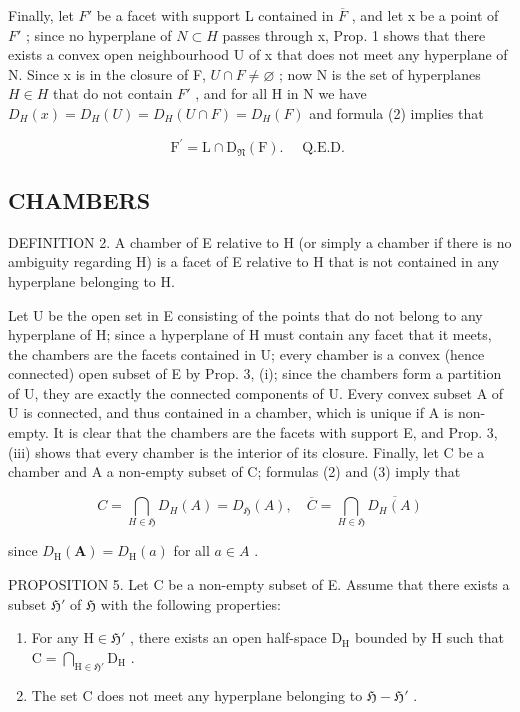 Finally, let \(F'\) be a facet with support L contained in \(\overline{F}\) , and let x be a point of \(F'\) ; since no hyperplane of \(N \subset H\) passes through x, Prop. 1 shows that there exists a convex open neighbourhood U of x that does not meet any hyperplane of N. Since x is in the closure of F, \(U \cap F \neq \varnothing\) ; now N is the set of hyperplanes \(H \in H\) that do not contain \(F'\) , and for all H in N we have \(D_{H}(x) = D_{H}(U) = D_{H}(U \cap F) = D_{H}(F)\) and formula (2) implies that

\[
\mathrm{F} ^ {\prime} = \mathrm{L} \cap \mathrm{D} _ {\mathfrak {N}} (\mathrm{F}). \quad \text { Q.E.D. }
\]

\subsection{CHAMBERS}

DEFINITION 2. A chamber of E relative to H (or simply a chamber if there is no ambiguity regarding H) is a facet of E relative to H that is not contained in any hyperplane belonging to H.

Let U be the open set in E consisting of the points that do not belong to any hyperplane of H; since a hyperplane of H must contain any facet that it meets, the chambers are the facets contained in U; every chamber is a convex (hence connected) open subset of E by Prop. 3, (i); since the chambers form a partition of U, they are exactly the connected components of U. Every convex subset A of U is connected, and thus contained in a chamber, which is unique if A is non-empty. It is clear that the chambers are the facets with support E, and Prop. 3, (iii) shows that every chamber is the interior of its closure. Finally, let C be a chamber and A a non-empty subset of C; formulas (2) and (3) imply that

\[
C = \bigcap_ {H \in \mathfrak {H}} D _ {H} (A) = D _ {\mathfrak {H}} (A), \quad \overline {{C}} = \bigcap_ {H \in \mathfrak {H}} \overline {{D _ {H} (A)}}\tag{6}
\]

since \(D_{\mathrm{H}}(\mathbf{A}) = D_{\mathrm{H}}(a)\) for all \(a \in A\) .

PROPOSITION 5. Let C be a non-empty subset of E. Assume that there exists a subset \(\mathfrak{H}'\) of \(\mathfrak{H}\) with the following properties:

\begin{enumerate}
\def\labelenumi{\alph{enumi})}
\item
  For any \(\mathrm{H} \in \mathfrak{H}'\) , there exists an open half-space \(\mathrm{D}_{\mathrm{H}}\) bounded by \(\mathrm{H}\) such that \(\mathrm{C} = \bigcap_{\mathrm{H} \in \mathfrak{H}'} \mathrm{D}_{\mathrm{H}}\) .
\item
  The set C does not meet any hyperplane belonging to \(\mathfrak{H} - \mathfrak{H}'\) .
\end{enumerate}

